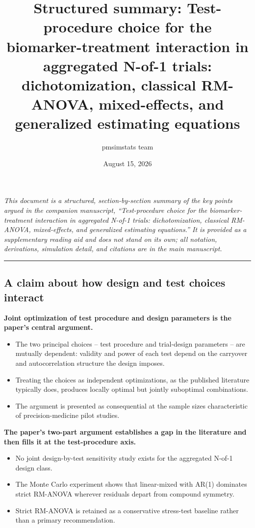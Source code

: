 \documentclass[
  11pt,
]{article}
\title{Structured summary: Test-procedure choice for the biomarker-treatment interaction in aggregated N-of-1 trials: dichotomization, classical RM-ANOVA, mixed-effects, and generalized estimating equations}
\author{pmsimstats team}
\date{August 15, 2026}
\begin{document}
\maketitle

{
\setcounter{tocdepth}{2}
\tableofcontents
}
\emph{This document is a structured, section-by-section summary of the key points argued in the companion manuscript, ``Test-procedure choice for the biomarker-treatment interaction in aggregated N-of-1 trials: dichotomization, classical RM-ANOVA, mixed-effects, and generalized estimating equations.'' It is provided as a supplementary reading aid and does not stand on its own; all notation, derivations, simulation detail, and citations are in the main manuscript.}

\bigskip\noindent

\rule{\textwidth}{0.4pt}\bigskip

\subsection{A claim about how design and test choices interact}\label{a-claim-about-how-design-and-test-choices-interact}

\textbf{Joint optimization of test procedure and design parameters is the paper's central argument.}

\begin{itemize}\setlength{\itemsep}{2pt}\setlength{\parskip}{0pt}
\item The two principal choices -- test procedure and trial-design parameters -- are mutually dependent: validity and power of each test depend on the carryover and autocorrelation structure the design imposes.
\item Treating the choices as independent optimizations, as the published literature typically does, produces locally optimal but jointly suboptimal combinations.
\item The argument is presented as consequential at the sample sizes characteristic of precision-medicine pilot studies.
\end{itemize}

\textbf{The paper's two-part argument establishes a gap in the literature and then fills it at the test-procedure axis.}

\begin{itemize}\setlength{\itemsep}{2pt}\setlength{\parskip}{0pt}
\item No joint design-by-test sensitivity study exists for the aggregated N-of-1 design class.
\item The Monte Carlo experiment shows that linear-mixed with AR(1) dominates strict RM-ANOVA wherever residuals depart from compound symmetry.
\item Strict RM-ANOVA is retained as a conservative stress-test baseline rather than a primary recommendation.
\end{itemize}
\end{document}
